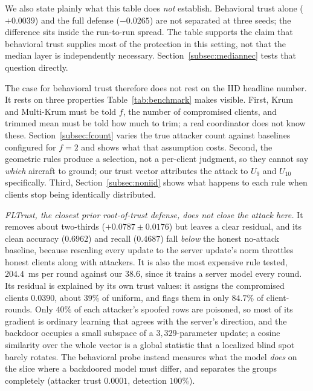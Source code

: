 \documentclass[journal]{IEEEtran}
\begin{document}
We also state plainly what this table does \emph{not} establish. Behavioral
trust alone ($+0.0039$) and the full defense ($-0.0265$) are not separated at
three seeds; the difference sits inside the run-to-run spread. The table
supports the claim that behavioral trust supplies most of the protection in
this setting, not that the median layer is independently necessary.
Section~\ref{subsec:mediannec} tests that question directly.

The case for behavioral trust therefore does not rest on the IID headline number. It rests on three properties Table~\ref{tab:benchmark} makes visible. First, Krum and Multi-Krum must be told $f$, the number of compromised clients, and trimmed mean must be told how much to trim; a real coordinator does not know these. Section~\ref{subsec:fcount} varies the true attacker count against baselines configured for $f=2$ and shows what that assumption costs. Second, the geometric rules produce a selection, not a per-client judgment, so they cannot say \emph{which} aircraft to ground; our trust vector attributes the attack to $U_9$ and $U_{10}$ specifically. Third, Section~\ref{subsec:noniid} shows what happens to each rule when clients stop being identically distributed.

\textit{FLTrust, the closest prior root-of-trust defense, does not close the attack here.} It removes about two-thirds ($+0.0787 \pm 0.0176$) but leaves a clear residual, and its clean accuracy ($0.6962$) and recall ($0.4687$) fall \emph{below} the honest no-attack baseline, because rescaling every update to the server update's norm throttles honest clients along with attackers. It is also the most expensive rule tested, $204.4$~ms per round against our $38.6$, since it trains a server model every round. Its residual is explained by its own trust values: it assigns the compromised clients $0.0390$, about $39\%$ of uniform, and flags them in only $84.7\%$ of client-rounds. Only $40\%$ of each attacker's spoofed rows are poisoned, so most of its gradient is ordinary learning that agrees with the server's direction, and the backdoor occupies a small subspace of a $3{,}329$-parameter update; a cosine similarity over the whole vector is a global statistic that a localized blind spot barely rotates. The behavioral probe instead measures what the model \emph{does} on the slice where a backdoored model must differ, and separates the groups completely (attacker trust $0.0001$, detection $100\%$).
\end{document}
